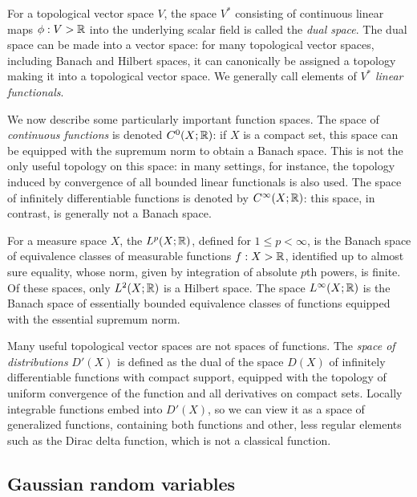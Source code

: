 \documentclass[11pt]{book}
\begin{document}
\label{ntn:dual-space}
For a topological vector space $V$, the space $V^*$ consisting of continuous linear maps $\phi : V \-> \mathbb{R}$ into the underlying scalar field is called the \emph{dual space}.
The dual space can be made into a vector space: for many topological vector spaces, including Banach and Hilbert spaces, it can canonically be assigned a topology making it into a topological vector space.
We generally call elements of $V^*$ \emph{linear functionals}.


\label{ntn:conts-fns}
We now describe some particularly important function spaces.
The space of \emph{continuous functions} is denoted $C^0(X;\mathbb{R})$: if $X$ is a compact set, this space can be equipped with the supremum norm to obtain a Banach space.
This is not the only useful topology on this space: in many settings, for instance, the topology induced by convergence of all bounded linear functionals is also used.
The space of infinitely differentiable functions is denoted by $C^\infty(X;\mathbb{R})$: this space, in contrast, is generally not a Banach space.

\label{ntn:leb-space}
For a measure space $X$, the  $L^p(X;\mathbb{R})$, defined for $1 \leq p < \infty$, is the Banach space of equivalence classes of measurable functions $f : X \-> \mathbb{R}$, identified up to almost sure equality, whose norm, given by integration of absolute $p$th powers, is finite.
Of these spaces, only $L^2(X;\mathbb{R})$ is a Hilbert space.
The space $L^\infty(X;\mathbb{R})$ is the Banach space of essentially bounded equivalence classes of functions equipped with the essential supremum norm.

Many useful topological vector spaces are not spaces of functions.
The \emph{space of distributions} $D'(X)$ is defined as the dual of the space $D(X)$ of infinitely differentiable functions with compact support, equipped with the topology of uniform convergence of the function and all derivatives on compact sets.
Locally integrable functions embed into $D'(X)$, so we can view it as a space of generalized functions, containing both functions and other, less regular elements such as the Dirac delta function, which is not a classical function.


\subsection{Gaussian random variables}
\end{document}
